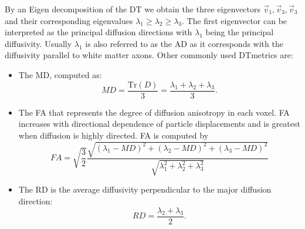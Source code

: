 By an Eigen decomposition of the {\gls{DT}} we obtain the three eigenvectors $\vec{v}_1, \vec{v}_3, \vec{v}_3$ and their corresponding eigenvalues $\lambda_1\ge\lambda_2\ge\lambda_3$. The first eigenvector can be interpreted as the principal diffusion directions with $\lambda_1$ being the principal diffusivity. Usually $\lambda_1$ is also referred to as the {\gls{AD}} as it corresponds with the diffusivity parallel to white matter axons\citep{Basser:1996}. Other commonly used {\gls{DT}}metrics are:
\begin{itemize}
	\item The {\gls{MD}}, computed as:
	\begin{equation}
		MD = \frac{\mbox{Tr}(D)}{3} = \frac{\lambda_1 + \lambda_2 +\lambda_3}{3}.
	\end{equation}
	\item The {\gls{FA}} that represents the degree of diffusion anisotropy in each voxel.  {\gls{FA}} increases
	with directional dependence of particle displacements and is greatest when diffusion is highly directed.  {\gls{FA}} is computed by
	\begin{equation}
		FA = \sqrt{\frac{3}{2}}\frac{\sqrt{(\lambda_1-MD)^2+(\lambda_2-MD)^2+(\lambda_3-MD)^2}}{\sqrt{\lambda_1^2+\lambda_2^2+\lambda_3^2}}
	\end{equation}
	\item The {\gls{RD}} is the average diffusivity perpendicular to the major diffusion direction:
	\begin{equation}
		RD = \frac{\lambda_2 + \lambda_3}{2}.
	\end{equation}
\end{itemize}

